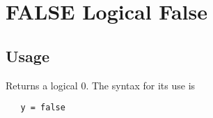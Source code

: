 \section{FALSE Logical False}

\subsection{Usage}

Returns a logical 0.  The syntax for its use is
\begin{verbatim}
   y = false
\end{verbatim}
